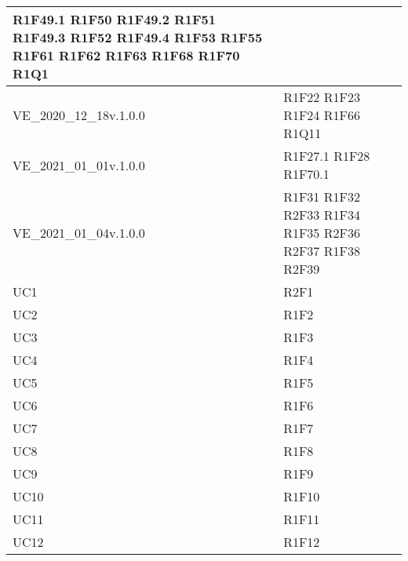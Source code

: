\begin{center}
\begin{longtable}{|p{44mm}|p{22mm}|}
R1F49.1 \newline
R1F50 \newline
R1F49.2 \newline
R1F51 \newline
R1F49.3 \newline
R1F52 \newline
R1F49.4 \newline
R1F53 \newline
R1F55 \newline
R1F61 \newline
R1F62 \newline
R1F63 \newline
R1F68 \newline
R1F70 \newline
R1Q1 
\\
\hline
VE\_2020\_12\_18v.1.0.0 &
R1F22 \newline
R1F23 \newline
R1F24 \newline
R1F66 \newline
R1Q11 
\\
\hline
VE\_2021\_01\_01v.1.0.0 &
R1F27.1 \newline
R1F28 \newline
R1F70.1 
\\
\hline
VE\_2021\_01\_04v.1.0.0 &
R1F31 \newline
R1F32 \newline
R2F33 \newline
R1F34 \newline
R1F35 \newline
R2F36 \newline
R2F37 \newline
R1F38 \newline
R2F39 
\\
\hline
UC1 &
R2F1 
\\
\hline
UC2 &
R1F2 
\\
\hline
UC3 &
R1F3 
\\
\hline
UC4 &
R1F4 
\\
\hline
UC5 &
R1F5 
\\
\hline
UC6 &
R1F6 
\\
\hline
UC7 &
R1F7 
\\
\hline
UC8 &
R1F8 
\\
\hline
UC9 &
R1F9 
\\
\hline
UC10 &
R1F10 
\\
\hline
UC11 &
R1F11 
\\
\hline
UC12 &
R1F12 
\\

\end{longtable}
\end{center}
